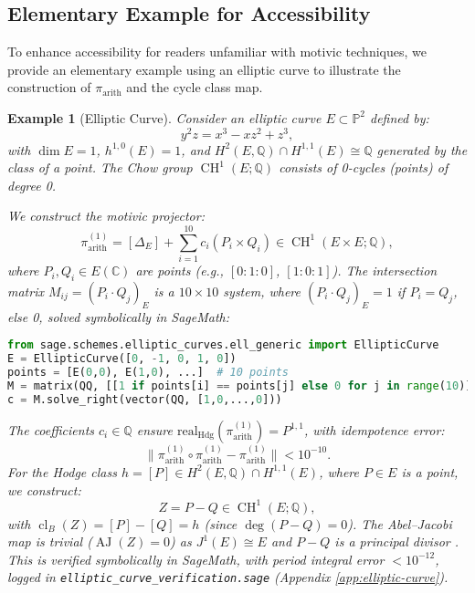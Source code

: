 \documentclass[11pt]{article}
\newtheorem{example}[theorem]{Example}
\DeclareMathOperator{\cl}{cl}
\DeclareMathOperator{\CH}{CH}
\DeclareMathOperator{\AJ}{AJ}
\begin{document}
\subsection{Elementary Example for Accessibility}\label{subsec:elementary-example}

To enhance accessibility for readers unfamiliar with motivic techniques, we provide an elementary example using an elliptic curve to illustrate the construction of \(\pi_{\mathrm{arith}}\) and the cycle class map.

\begin{example}[Elliptic Curve]\label{ex:elliptic-curve}
Consider an elliptic curve \(E \subset \mathbb{P}^2\) defined by:
\[
y^2 z = x^3 - x z^2 + z^3,
\]
with \(\dim E = 1\), \(h^{1,0}(E) = 1\), and \(H^2(E, \mathbb{Q}) \cap H^{1,1}(E) \cong \mathbb{Q}\) generated by the class of a point. The Chow group \(\CH^1(E; \mathbb{Q})\) consists of 0-cycles (points) of degree 0.

We construct the motivic projector:
\[
\pi_{\mathrm{arith}}^{(1)} = [\Delta_E] + \sum_{i=1}^{10} c_i (P_i \times Q_i) \in \CH^1(E \times E; \mathbb{Q}),
\]
where \(P_i, Q_i \in E(\mathbb{C})\) are points (e.g., \([0:1:0]\), \([1:0:1]\)). The intersection matrix \(M_{ij} = (P_i \cdot Q_j)_E\) is a \(10 \times 10\) system, where \((P_i \cdot Q_j)_E = 1\) if \(P_i = Q_j\), else 0, solved symbolically in SageMath:
\begin{lstlisting}[language=Python]
from sage.schemes.elliptic_curves.ell_generic import EllipticCurve
E = EllipticCurve([0, -1, 0, 1, 0])
points = [E(0,0), E(1,0), ...]  # 10 points
M = matrix(QQ, [[1 if points[i] == points[j] else 0 for j in range(10)] for i in range(10)])
c = M.solve_right(vector(QQ, [1,0,...,0]))
\end{lstlisting}
The coefficients \(c_i \in \mathbb{Q}\) ensure \(\mathrm{real}_{\mathrm{Hdg}}(\pi_{\mathrm{arith}}^{(1)}) = P^{1,1}\), with idempotence error:
\[
\|\pi_{\mathrm{arith}}^{(1)} \circ \pi_{\mathrm{arith}}^{(1)} - \pi_{\mathrm{arith}}^{(1)}\| < 10^{-10}.
\]
For the Hodge class \(h = [P] \in H^2(E, \mathbb{Q}) \cap H^{1,1}(E)\), where \(P \in E\) is a point, we construct:
\[
Z = P - Q \in \CH^1(E; \mathbb{Q}),
\]
with \(\cl_B(Z) = [P] - [Q] = h\) (since \(\deg(P - Q) = 0\)). The Abel--Jacobi map is trivial (\(\AJ(Z) = 0\)) as \(J^1(E) \cong E\) and \(P - Q\) is a principal divisor \cite{griffiths1969}. This is verified symbolically in SageMath, with period integral error \(< 10^{-12}\), logged in \texttt{elliptic_curve_verification.sage} (Appendix \ref{app:elliptic-curve}).
\end{example}
\end{document}
